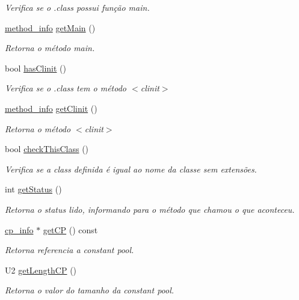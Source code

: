 \begin{DoxyCompactItemize}
\begin{DoxyCompactList}\small\item\em Verifica se o .class possui função main. \end{DoxyCompactList}\item 
\hyperlink{structmethod__info}{method\+\_\+info} \hyperlink{classLeitor_a462716ecacea891a2e07e77eec0dabe7}{get\+Main} ()
\begin{DoxyCompactList}\small\item\em Retorna o método main. \end{DoxyCompactList}\item 
bool \hyperlink{classLeitor_a31934be87590ff3732b3117ebe96cc34}{has\+Clinit} ()
\begin{DoxyCompactList}\small\item\em Verifica se o .class tem o método $<$clinit$>$ \end{DoxyCompactList}\item 
\hyperlink{structmethod__info}{method\+\_\+info} \hyperlink{classLeitor_a4c64b307c9690ba25f04e911e07fe5a3}{get\+Clinit} ()
\begin{DoxyCompactList}\small\item\em Retorna o método $<$clinit$>$ \end{DoxyCompactList}\item 
bool \hyperlink{classLeitor_a46501dcb0e924524b6354f5459503ce8}{check\+This\+Class} ()
\begin{DoxyCompactList}\small\item\em Verifica se a class definida é igual ao nome da classe sem extensões. \end{DoxyCompactList}\item 
int \hyperlink{classLeitor_a55c4c9df6771ce70388001a064f28256}{get\+Status} ()
\begin{DoxyCompactList}\small\item\em Retorna o status lido, informando para o método que chamou o que aconteceu. \end{DoxyCompactList}\item 
\hyperlink{structcp__info}{cp\+\_\+info} $\ast$ \hyperlink{classLeitor_a95bd2e9979122b1d742ce2e0dd6c4a4b}{get\+CP} () const
\begin{DoxyCompactList}\small\item\em Retorna referencia a constant pool. \end{DoxyCompactList}\item 
U2 \hyperlink{classLeitor_a53b7aac0c6d2b75104c6d53abd23b37e}{get\+Length\+CP} ()
\begin{DoxyCompactList}\small\item\em Retorna o valor do tamanho da constant pool. \end{DoxyCompactList}\item 

\end{DoxyCompactItemize}
